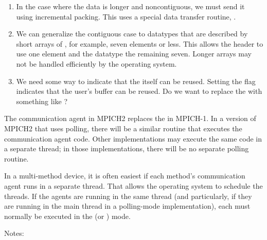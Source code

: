 \begin{enumerate}
\item In the case where the data is longer and noncontiguous, we must send it
  using incremental packing.  This uses a special data transfer routine,
  .

\item We can generalize the contiguous case to datatypes that are described by
  short arrays of , for example, seven elements or less.
  This allows the header to use one element and the datatype the remaining
  seven.  Longer arrays may not be handled efficiently by the operating
  system. 

\item We need some way to indicate that the  itself can be
  reused.  Setting the  flag indicates that the user's buffer
  can be reused.  Do we want to replace the  with something like
  ?
\end{enumerate}

The communication agent in MPICH2 replaces the  in
MPICH-1.  In a version of MPICH2 that uses polling, there will be a similar
routine that executes the communication agent code.  Other implementations may
execute the same code in a separate thread; in those implementations, there
will be no separate polling routine.

In a multi-method device, it is often easiest if each method's communication 
agent runs in a separate thread.  That allows the operating system to 
schedule the threads.  If the agents are running in the same thread (and 
particularly, if they are running in the main thread in a polling-mode 
implementation), each must normally be executed in the  (or 
) mode.



Notes:

